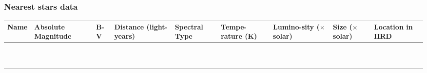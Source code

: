 \documentclass[main.tex]{subfiles}
\begin{document}
\subsubsection{Nearest stars data}
\begin{table}[h!]
\begin{center}
\begin{tabular}{|p{1.5cm}|p{1.5cm}|p{1cm}|p{1.5cm}|p{1.5cm}|p{1.5cm}|p{1.5cm}|p{1.5cm}|p{1.5cm}|}\hline
Name & Absolute Magnitude & B-V & Distance (light-years) & Spectral Type & Tempe-rature (K) & Lumino-sity ($\times$ solar) & Size ($\times$ solar) & Location in HRD \\\hline
&&&&&&&&\\\hline
&&&&&&&&\\\hline
&&&&&&&&\\\hline
&&&&&&&&\\\hline
&&&&&&&&\\\hline
&&&&&&&&\\\hline
&&&&&&&&\\\hline
&&&&&&&&\\\hline
&&&&&&&&\\\hline
&&&&&&&&\\\hline
\end{tabular}
\end{center}
\label{tab:star}
\end{table}%
\end{document}
